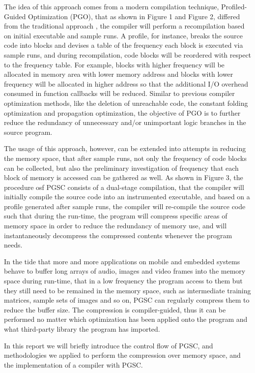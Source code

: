 \documentclass[]{article}
\begin{document}
The idea of this approach comes from a modern compilation technique, Profiled-Guided Optimization (PGO), that as shown in Figure 1 and Figure 2, differed from the traditional approach \cite{CompilerDesign}, the compiler will perform a recompilation based on initial executable and sample runs. A profile, for instance, breaks the source code into blocks and devises a table of the frequency each block is executed via sample runs, and during recompilation, code blocks will be reordered with respect to the frequency table. For example, blocks with higher frequency will be allocated in memory area with lower memory address and blocks with lower frequency will be allocated in higher address so that the additional I/O overhead consumed in function callbacks will be reduced. Similar to previous compiler optimization methods, like the deletion of unreachable code, the constant folding optimization and propagation optimization, the objective of PGO is to further reduce the redundancy of unnecessary and/or unimportant logic branches in the source program. \par 
The usage of this approach, however, can be extended into attempts in reducing the memory space, that after sample runs, not only the frequency of code blocks can be collected, but also the preliminary investigation of frequency that each block of memory is accessed can be gathered as well. As shown in Figure 3, the procedure osf PGSC consists of a dual-stage compilation, that the compiler will initially compile the source code into an instrumented executable, and based on a profile generated after sample runs, the compiler will re-compile the source code such that during the run-time, the program will compress specific areas of memory space in order to reduce the redundancy of memory use, and will instantaneously decompress the compressed contents whenever the program needs. \par 
In the tide that more and more applications on mobile and embedded systems behave to buffer long arrays of audio, images and video frames into the memory space during run-time, that in a low frequency the program access to them but they still need to be remained in the memory space, such as intermediate training matrices, sample sets of images and so on, PGSC can regularly compress them to reduce the buffer size. The compression is compiler-guided, thus it can be performed no matter which optimization has been applied onto the program and what third-party library the program has imported. \par 
In this report we will briefly introduce the control flow of PGSC, and methodologies we applied to perform the compression over memory space, and the implementation of a compiler with PGSC. 
\end{document}
